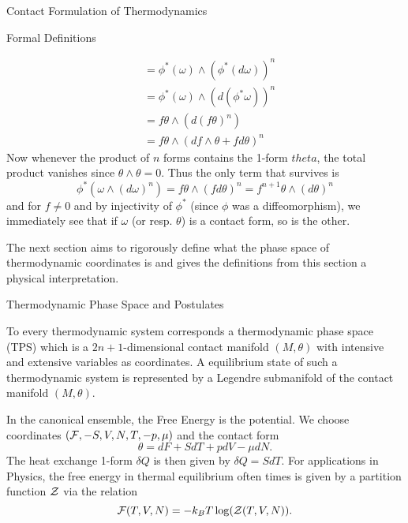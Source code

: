 \begin{section}{Contact Formulation of Thermodynamics}
\begin{subsection}{Formal Definitions}
\begin{corollary}
\begin{align*}
											&= \phi^*(\omega)\wedge(\phi^*(d\omega))^n\\
											&= \phi^*(\omega)\wedge(d(\phi^*\omega))^n\\
											&= f\theta\wedge(d(f\theta)^n)\\
											&= f\theta\wedge(df\wedge\theta+fd\theta)^n
	\end{align*}
	Now whenever the product of $n$ forms contains the 1-form $theta$, the total product vanishes since $\theta\wedge\theta=0$. Thus the only term that survives is
	\begin{equation}
		\phi^*(\omega\wedge(d\omega)^n) = f\theta\wedge(fd\theta)^n = f^{n+1}\theta\wedge(d\theta)^n
	\end{equation}
	and for $f\neq0$ and by injectivity of $\phi^*$ (since $\phi$ was a diffeomorphism), we immediately see that if $\omega$ (or resp. $\theta$) is a contact form, so is the other.
\end{corollary}
The next section aims to rigorously define what the phase space of thermodynamic coordinates is and gives the definitions from this section a physical interpretation.
\end{subsection}
%
%
%
\newpage
\begin{subsection}{Thermodynamic Phase Space and Postulates}
\begin{postulate}
	To every thermodynamic system corresponds a thermodynamic phase space (TPS) which is a $2n+1$-dimensional contact manifold $(M,\theta)$ with intensive and extensive variables as coordinates. A equilibrium state of such a thermodynamic system is represented by a Legendre submanifold of the contact manifold $(M,\theta)$.
\end{postulate}
\begin{example}
	In the canonical ensemble, the Free Energy is the potential. We choose coordinates $(\mathcal{F},-S,V,N,T,-p,\mu)$ and the contact form
	\begin{equation}
		\theta = dF +SdT+pdV-\mu dN.
	\end{equation}
	The heat exchange 1-form $\delta Q$ is then given by $\delta Q=SdT$. For applications in Physics, the free energy in thermal equilibrium often times is given by a partition function $\mathcal{Z}$ via the relation
	\begin{equation}
		\F(T,V,N)=-k_BT\log(\Z(T,V,N)).

\end{equation}
\end{example}
\end{subsection}
\end{section}
